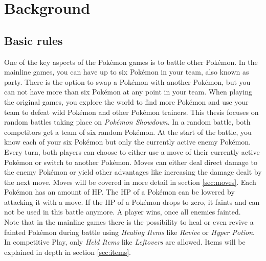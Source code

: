 \chapter{Background}

\section{Basic rules}
\label{sec:battling}
One of the key aspects of the Pokémon games is to battle other Pokémon. In the mainline games, you can 
have up to six Pokémon in your team, also known as party. There is the option to swap a Pokémon with
another Pokémon, but you can not have more than six Pokémon at any point in your team. When playing the 
original games, you explore the world to find more Pokémon and use your team to defeat wild Pokémon
and other Pokémon trainers. This thesis focuses on random battles taking place on \textit{Pokémon Showdown}.
In a random battle, both competitors get a team of six random Pokémon. At the start of the battle,
you know each of your six Pokémon but only the currently active enemy Pokémon. \\
Every turn, both players can choose to either use a move of their currently active Pokémon or switch
to another Pokémon. Moves can either deal direct damage to the enemy Pokémon or 
yield other advantages like increasing the damage dealt by the next move. Moves will be covered in more
detail in section \ref{sec:moves}. Each Pokémon has an amount of \ac{HP}. The \ac{HP} of a Pokémon
can be lowered by attacking it with a move. If the \ac{HP} of a Pokémon drops to zero, it faints and 
can not be used in this battle anymore. A player wins, once all enemies fainted. \\
Note that in the mainline games there is the possibility to heal or even revive a fainted 
Pokémon during battle using \textit{Healing Items} like \textit{Revive} or \textit{Hyper Potion}.
In competitive Play, only \textit{Held Items} like \textit{Leftovers} are allowed. Items will be explained
in depth in section \ref{sec:items}.

